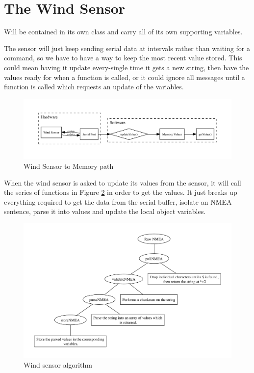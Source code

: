 \documentclass[letterpaper]{article}
\begin{document}

\section{The Wind Sensor} %
\label{sec:The Wind Sensor}

Will be contained in its own class and carry all of its own supporting variables.

The sensor will just keep sending serial data at intervals rather than waiting for a command, so we have to have a way to keep the most recent value stored. This could mean having it update every-single time it gets a new string, then have the values ready for when a function is called, or it could ignore all messages until a function is called which requests an update of the variables.

\begin{figure}[h]
	\centering
	\includegraphics[width=\linewidth]{maps/WindSerial.pdf}
	\caption{Wind Sensor to Memory path}
	\label{fig:WindSensorMap}
\end{figure}

When the wind sensor is asked to update its values from the sensor, it will call the series of functions in Figure \ref{fig:newparse} in order to get the values. It just breaks up everything required to get the data from the serial buffer, isolate an NMEA sentence, parse it into values and update the local object variables.

\begin{figure}[h]
	\centering
	\includegraphics[width=\linewidth]{maps/newparse.pdf}
	\caption{Wind sensor algorithm}
	\label{fig:newparse}
\end{figure}
\end{document}
